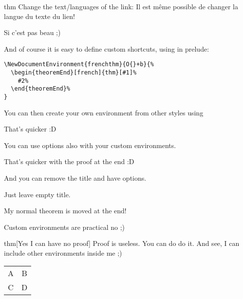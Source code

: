 \documentclass{article}
\begin{document}
\begin{theoremEnd}[french]{thm}%
  Change the text/languages of the link: Il est même possible de changer la langue du texte du lien!  
\end{theoremEnd}
\begin{proofEnd}
  Si c'est pas beau ;)
\end{proofEnd}

And of course it is easy to define custom shortcuts, using in prelude:
\begin{verbatim}
\NewDocumentEnvironment{frenchthm}{O{}+b}{%
  \begin{theoremEnd}[french]{thm}[#1]%
    #2%
  \end{theoremEnd}%
}
\end{verbatim}

\begin{mynormalthm}
  You can then create your own environment from other styles using
\end{mynormalthm}
\begin{proofEnd}
  That's quicker :D
\end{proofEnd}

\begin{mynormalthm}
  You can use options also with your custom environments.
\end{mynormalthm}
\begin{proofEnd}
  That's quicker with the proof at the end :D
\end{proofEnd}

\begin{mynormalthm}[][end]
  And you can remove the title and have options.
\end{mynormalthm}
\begin{proofEnd}
  Just leave empty title.
\end{proofEnd}

\begin{mynormalthm}
  My normal theorem is moved at the end!
\end{mynormalthm}
\begin{proofEnd}
  Custom environments are practical no ;)
\end{proofEnd}

\begin{theoremEnd}[]{thm}[Yes I can have no proof]
  Proof is useless. You can do do it. And see, I can include other environments inside me ;)\\
  \begin{tabular}{ c c } 
    A & B \\ 
    C & D \\ 
  \end{tabular}
\end{theoremEnd}
\end{document}
